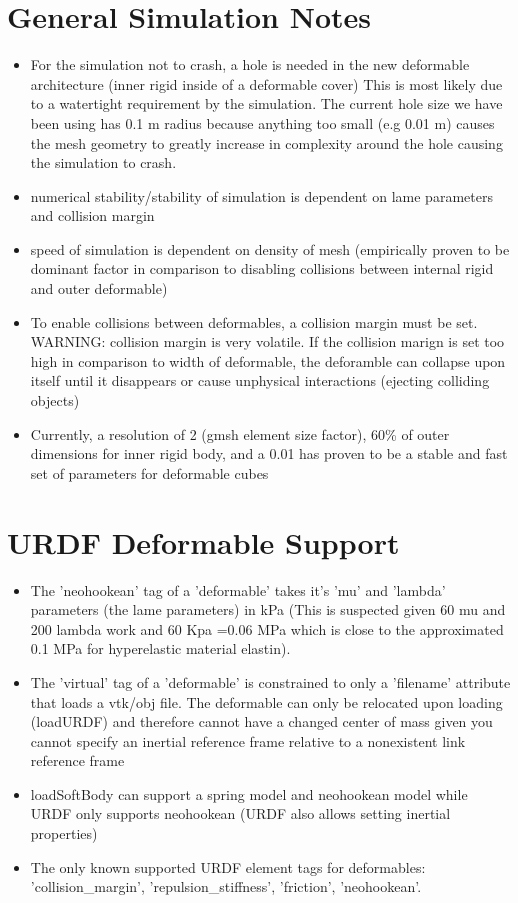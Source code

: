 \documentclass{article}
\begin{document}
\section{General Simulation Notes}
\begin{itemize}
    \item For the simulation not to crash, a hole is needed in the new deformable architecture (inner rigid inside of a deformable cover)
          This is most likely due to a watertight requirement by the simulation. The current hole size we have been using has 0.1 m radius because
          anything too small (e.g 0.01 m) causes the mesh geometry to greatly increase in complexity around the hole causing the simulation to crash.
    \item numerical stability/stability of simulation is dependent on lame parameters and collision margin
    \item speed of simulation is dependent on density of mesh (empirically proven to be dominant factor in comparison to
          disabling collisions between internal rigid and outer deformable)
    \item To enable collisions between deformables, a collision margin must be set. WARNING: collision margin is very volatile. If the collision marign is set too high in comparison to width of deformable,
          the deforamble can collapse upon itself until it disappears or cause unphysical interactions (ejecting colliding objects)
    \item Currently, a resolution of 2 (gmsh element size factor), 60\% of outer dimensions for inner rigid body, and a 0.01
          has proven to be a stable and fast set of parameters for deformable cubes
\end{itemize}

\section{URDF Deformable Support}
\begin{itemize}
    \item The 'neohookean' tag of a 'deformable' takes it's 'mu' and 'lambda' parameters (the lame parameters) in kPa (This is suspected given 60 mu and 200 lambda work and 60 Kpa =0.06 MPa which is close to the approximated 0.1 MPa for hyperelastic material elastin).
    \item The 'virtual' tag of a 'deformable' is constrained to only a 'filename' attribute that loads a vtk/obj file. The deformable can only be relocated upon loading (loadURDF) and therefore cannot have a changed center of mass given you cannot specify an inertial reference frame relative to a nonexistent link reference frame
    \item loadSoftBody can support a spring model and neohookean model while URDF only supports neohookean (URDF also allows setting inertial properties)
    \item The only known supported URDF element tags for deformables: 'collision\_margin', 'repulsion\_stiffness', 'friction', 'neohookean'.
\end{itemize}
\end{document}
